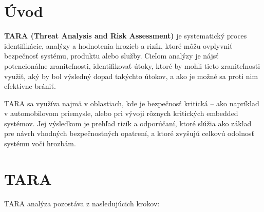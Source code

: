 \documentclass[11pt]{article}
\begin{document}

\tableofcontents
\newpage

\section{Úvod}
\textbf{TARA (Threat Analysis and Risk Assessment)} je systematický proces identifikácie, analýzy a hodnotenia hrozieb a rizík, ktoré môžu ovplyvniť bezpečnosť systému, produktu alebo služby. Cieľom analýzy je nájsť potencionálne zraniteľnosti, identifikovať útoky, ktoré by mohli tieto zraniteľnosti využiť, aký by bol výsledný dopad takýchto útokov, a ako je možné sa proti nim efektívne brániť.

TARA sa využíva najmä v oblastiach, kde je bezpečnosť kritická -- ako napríklad v automobilovom priemysle, alebo pri vývoji rôznych kritických embedded systémov. Jej výsledkom je prehľad rizík a odporúčaní, ktoré slúžia ako základ pre návrh vhodných bezpečnostných opatrení, a ktoré zvyšujú celkovú odolnosť systému voči hrozbám.

\section{TARA}
TARA analýza pozostáva z nasledujúcich krokov:
\end{document}
